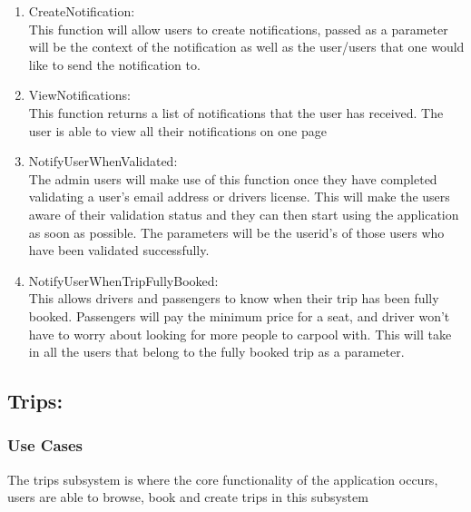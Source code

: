 \documentclass[hidelinks, 12pt, a4paper]{article}
\begin{document}
             \begin{enumerate}[label=U1.\arabic*]

                \item CreateNotification:\\
                    This function will allow users to create notifications, passed as a parameter will be the context of the notification as well as the user/users that one would like to send the notification to.\\

                \item ViewNotifications:\\
                	This function returns a list of notifications that the user has received. The user is able to view all their notifications on one page\\

                \item NotifyUserWhenValidated:\\
                    The admin users will make use of this function once they have completed validating a user’s email address or drivers license. This will make the users aware of their validation status and they can then start using the application as soon as possible. The parameters will be the userid’s of those users who have been validated successfully.\\
                	
                \item NotifyUserWhenTripFullyBooked: \\
                    This allows drivers and passengers to know when their trip has been fully booked. Passengers will pay the minimum price for a seat, and driver won’t have to worry about looking for more people to carpool with. This will take in all the users that belong to the fully booked trip as a parameter.\\
               
     \end{enumerate}
\newpage
                \subsection{Trips:}
                \subsubsection{Use Cases}
                    The trips subsystem is where the core functionality of the application occurs, users are able to browse, book and create trips in this subsystem
                    
\end{document}
